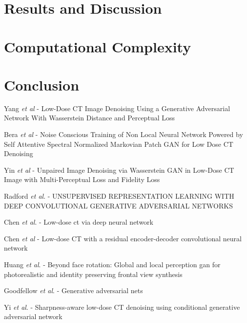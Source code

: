 \documentclass[journal]{IEEEtran}
\begin{document}
\section{Results and Discussion}
\label{results and discussion}

\section{Computational Complexity}
\label{complexity}

\section{Conclusion}
\label{conclusion}

\cite{8340157} Yang \emph{et al} - Low-Dose CT Image Denoising Using a Generative Adversarial Network With Wasserstein Distance and Perceptual Loss

\cite{9474492} Bera \emph{et al} - Noise Conscious Training of Non Local Neural Network Powered by Self Attentive Spectral Normalized Markovian Patch GAN for Low Dose CT Denoising

\cite{yin2021unpaired} Yin \emph{et al} - Unpaired Image Denoising via Wasserstein GAN in Low-Dose CT Image with Multi-Perceptual Loss and Fidelity Loss

\cite{radford2015unsupervised} Radford \emph{et al}. - UNSUPERVISED REPRESENTATION LEARNING WITH DEEP CONVOLUTIONAL GENERATIVE ADVERSARIAL NETWORKS

\cite{chen2017low} Chen \emph{et al}. - Low-dose ct via deep neural network

\cite{chen2017low2} Chen \emph{et al} - Low-dose CT with a residual encoder-decoder convolutional neural network

\cite{huang2017beyond} Huang \emph{et al}. - Beyond face rotation: Global and local perception gan for photorealistic and identity preserving frontal view synthesis

\cite{goodfellow2014generative} Goodfellow \emph{et al}. - Generative adversarial nets

\cite{yi2018sharpness} Yi \emph{et al}. - Sharpness-aware low-dose CT denoising using conditional generative adversarial network



\end{document}
